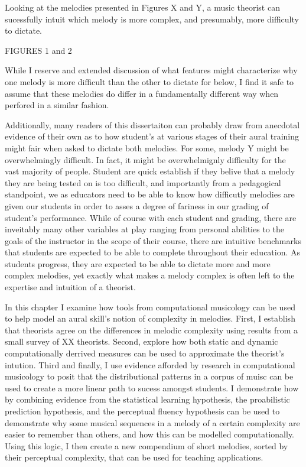 \documentclass[]{book}
\begin{document}
Looking at the melodies presented in Figures X and Y, a music theorist can sucessfully intuit which melody is more complex, and presumably, more difficulty to dictate.

FIGURES 1 and 2

While I reserve and extended discussion of what features might characterize why one melody is more difficult than the other to dictate for below, I find it safe to assume that these melodies do differ in a fundamentally different way when perfored in a similar fashion.

Additionally, many readers of this dissertaiton can probably draw from anecdotal evidence of their own as to how student's at various stages of their aural training might fair when asked to dictate both melodies.
For some, melody Y might be overwhelmingly difficult.
In fact, it might be overwhelmignly difficulty for the vast majority of people.
Student are quick establish if they belive that a melody they are being tested on is too difficult, and importantly from a pedagogical standpoint, we as educators need to be able to know how difficutly melodies are given our students in order to asses a degree of fariness in our grading of student's performance.
While of course with each student and grading, there are inveitably many other variables at play ranging from personal abilities to the goals of the instructor in the scope of their course, there are intuitive benchmarks that students are expected to be able to complete throughout their education.
As students progress, they are expected to be able to dictate more and more complex melodies, yet exactly what makes a melody complex is often left to the expertise and intuition of a theorist.

In this chapter I examine how tools from computational musicology can be used to help model an aural skill's notion of complexity in melodies.
First, I establish that theorists agree on the differences in melodic complexity using results from a small survey of XX theorists.
Second, explore how both static and dynamic computationally derrived measures can be used to approximate the theorist's intution.
Third and finally, I use evidence afforded by research in computational musicology to posit that the distributional patterns in a corpus of muisc can be used to create a more linear path to sucess amongst students.
I demonstrate how by combining evidence from the statistical learning hypothesis, the proabilistic prediction hypothesis, and the perceptual fluency hypothesis can be used to demonstrate why some musical sequences in a melody of a certain complexity are easier to remember than others, and how this can be modelled computationally.
Using this logic, I then create a new compendium of short melodies, sorted by their perceptual complexity, that can be used for teaching applications.
\end{document}
